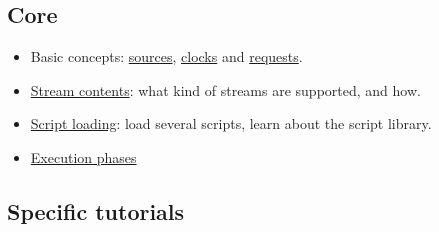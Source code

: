 \subsection{Core}
\begin{itemize}
\item Basic concepts: \href{sources.html}{sources}, \href{clocks.html}{clocks} and \href{requests.html}{requests}.
\item \href{stream_content.html}{Stream contents}: what kind of streams are supported, and how.
\item \href{script_loading.html}{Script loading}: load several scripts, learn about the script library.
\item \href{phases.html}{Execution phases}

\end{itemize}
\subsection{Specific tutorials }
